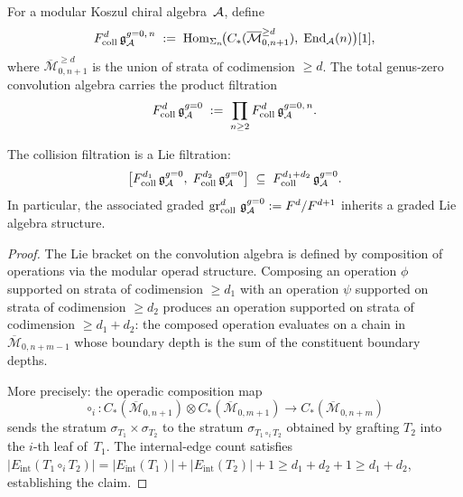 \begin{definition}
\label{def:thqg-V-collision-filtration-grading}
For a modular Koszul chiral algebra~$\mathcal{A}$, define
\begin{equation}\label{eq:thqg-V-collision-filtration-grading}
F^d_{\mathrm{coll}}\,
\mathfrak{g}^{g{=}0,\,n}_{\mathcal{A}}
\;:=\;
\operatorname{Hom}_{\Sigma_n}\!\bigl(
 C_*(\overline{\mathcal{M}}_{0,n+1}^{\geq d}),\;
 \operatorname{End}_{\mathcal{A}}(n)
\bigr)[1],
\end{equation}
where $\overline{\mathcal{M}}_{0,n+1}^{\geq d}$ is the union of
strata of codimension $\geq d$. The total genus-zero convolution
algebra carries the product filtration
\begin{equation}\label{eq:thqg-V-total-collision}
F^d_{\mathrm{coll}}\,
\mathfrak{g}^{g{=}0}_{\mathcal{A}}
\;:=\;
\prod_{n \geq 2}
F^d_{\mathrm{coll}}\,
\mathfrak{g}^{g{=}0,\,n}_{\mathcal{A}}.
\end{equation}
\end{definition}

\begin{lemma}
\label{lem:thqg-V-collision-lie-compatibility}
The collision filtration is a Lie filtration:
\begin{equation}\label{eq:thqg-V-lie-filtration}
\bigl[
 F^{d_1}_{\mathrm{coll}}\,\mathfrak{g}^{g{=}0}_{\mathcal{A}},\;
 F^{d_2}_{\mathrm{coll}}\,\mathfrak{g}^{g{=}0}_{\mathcal{A}}
\bigr]
\;\subseteq\;
F^{d_1+d_2}_{\mathrm{coll}}\,\mathfrak{g}^{g{=}0}_{\mathcal{A}}.
\end{equation}
In particular, the associated graded
$\operatorname{gr}_{\mathrm{coll}}^d\,\mathfrak{g}^{g{=}0}_{\mathcal{A}}
:= F^d / F^{d+1}$
inherits a graded Lie algebra structure.
\end{lemma}

\begin{proof}
The Lie bracket on the convolution algebra is defined by composition of
operations via the modular operad structure. Composing an operation
$\phi$ supported on strata of codimension $\geq d_1$ with an operation
$\psi$ supported on strata of codimension $\geq d_2$ produces an
operation supported on strata of codimension $\geq d_1 + d_2$: the
composed operation evaluates on a chain in
$\overline{\mathcal{M}}_{0,n+m-1}$ whose boundary depth is the sum of
the constituent boundary depths.

More precisely: the operadic composition map
\[
\circ_i\colon
C_*(\overline{\mathcal{M}}_{0,n+1}) \otimes
C_*(\overline{\mathcal{M}}_{0,m+1})
\to
C_*(\overline{\mathcal{M}}_{0,n+m})
\]
sends the stratum $\sigma_{T_1} \times \sigma_{T_2}$ to the stratum
$\sigma_{T_1 \circ_i T_2}$ obtained by grafting $T_2$ into the
$i$-th leaf of~$T_1$. The internal-edge count satisfies
$|E_{\mathrm{int}}(T_1 \circ_i T_2)| =
|E_{\mathrm{int}}(T_1)| + |E_{\mathrm{int}}(T_2)| + 1
\geq d_1 + d_2 + 1 \geq d_1 + d_2$,
establishing the claim.
\end{proof}

